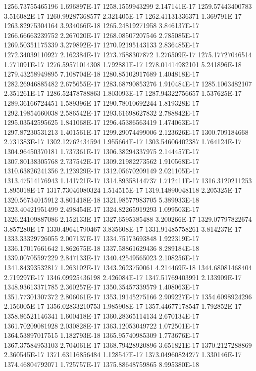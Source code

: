 1256.73755465196  1.696897E-17
1258.1559943299  2.147141E-17
1259.57443400783  3.516082E-17
1260.99287368577  2.321405E-17
1262.41131336371  1.369791E-17
1263.82975304164  3.934066E-18
1265.24819271958  3.846137E-17
1266.66663239752  2.267020E-17
1268.08507207546  2.785085E-17
1269.50351175339  3.279892E-17
1270.92195143133  2.836485E-17
1272.34039110927  2.162384E-17
1273.7588307872  1.276509E-17
1275.17727046514  1.771091E-17
1276.59571014308  1.792881E-17
1278.01414982101  5.241896E-18
1279.43258949895  7.108704E-18
1280.85102917689  1.404818E-17
1282.26946885482  2.675655E-17
1283.68790853276  1.910484E-17
1285.1063482107  2.351261E-17
1286.52478788863  1.803093E-17
1287.94322756657  1.537625E-17
1289.36166724451  1.589396E-17
1290.78010692244  1.819328E-17
1292.19854660038  2.586542E-17
1293.61698627832  2.788842E-17
1295.03542595625  1.841068E-17
1296.45386563419  1.474063E-17
1297.87230531213  1.401561E-17
1299.29074499006  2.123626E-17
1300.709184668  2.731383E-17
1302.12762434594  1.955664E-17
1303.54606402387  1.764124E-17
1304.96450370181  1.737361E-17
1306.38294337975  2.144457E-17
1307.80138305768  2.737542E-17
1309.21982273562  1.910568E-17
1310.63826241356  2.123929E-17
1312.05670209149  2.021105E-17
1313.47514176943  1.141721E-17
1314.89358144737  1.712411E-17
1316.3120211253  1.895018E-17
1317.73046080324  1.514515E-17
1319.14890048118  2.205325E-17
1320.56734015912  3.801418E-18
1321.98577983705  5.389933E-18
1323.40421951499  2.498454E-17
1324.82265919293  1.099503E-17
1326.24109887086  2.152133E-17
1327.6595385488  3.200266E-17
1329.07797822674  3.857280E-17
1330.49641790467  3.835608E-17
1331.91485758261  3.814237E-17
1333.33329726055  2.007137E-17
1334.75173693848  1.922319E-17
1336.17017661642  1.862675E-18
1337.58861629436  8.289184E-18
1339.00705597229  2.847133E-17
1340.42549565023  2.108256E-17
1341.84393532817  1.263102E-17
1343.2623750061  4.214469E-18
1344.68081468404  2.719297E-17
1346.09925436198  2.426084E-17
1347.51769403991  2.133909E-17
1348.93613371785  2.360257E-17
1350.35457339579  1.408063E-17
1351.77301307372  2.806061E-17
1353.19145275166  2.909227E-17
1354.6098924296  2.156005E-17
1356.02833210753  1.985908E-17
1357.44677178547  1.792852E-17
1358.86521146341  1.600418E-17
1360.28365114134  2.670134E-17
1361.70209081928  2.030828E-17
1363.12053049722  1.072501E-17
1364.53897017515  1.182793E-18
1365.95740985309  1.773676E-17
1367.37584953103  2.704061E-17
1368.79428920896  3.651821E-17
1370.2127288869  2.360545E-17
1371.63116856484  1.128547E-17
1373.04960824277  1.330146E-17
1374.46804792071  1.725757E-17
1375.88648759865  8.995380E-18
